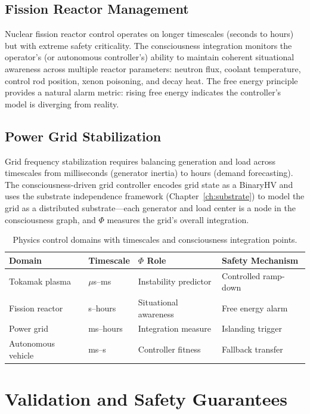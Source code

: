 \documentclass[12pt]{book}
\begin{document}
\subsection{Fission Reactor Management}

Nuclear fission reactor control operates on longer timescales (seconds to hours) but with extreme safety criticality. The consciousness integration monitors the operator's (or autonomous controller's) ability to maintain coherent situational awareness across multiple reactor parameters: neutron flux, coolant temperature, control rod position, xenon poisoning, and decay heat. The free energy principle provides a natural alarm metric: rising free energy indicates the controller's model is diverging from reality.

\subsection{Power Grid Stabilization}

Grid frequency stabilization requires balancing generation and load across timescales from milliseconds (generator inertia) to hours (demand forecasting). The consciousness-driven grid controller encodes grid state as a BinaryHV and uses the substrate independence framework (Chapter~\ref{ch:substrate}) to model the grid as a distributed substrate---each generator and load center is a node in the consciousness graph, and $\Phi$ measures the grid's overall integration.

\begin{table}[htbp]
\centering
\caption{Physics control domains with timescales and consciousness integration points.}
\label{tab:physics-control}
\begin{tabular}{@{}llll@{}}
\toprule
\textbf{Domain} & \textbf{Timescale} & \textbf{$\Phi$ Role} & \textbf{Safety Mechanism} \\
\midrule
Tokamak plasma   & $\mu$s--ms   & Instability predictor & Controlled ramp-down \\
Fission reactor  & s--hours     & Situational awareness & Free energy alarm \\
Power grid       & ms--hours    & Integration measure   & Islanding trigger \\
Autonomous vehicle & ms--s      & Controller fitness    & Fallback transfer \\
\bottomrule
\end{tabular}
\end{table}

\section{Validation and Safety Guarantees}
\end{document}
